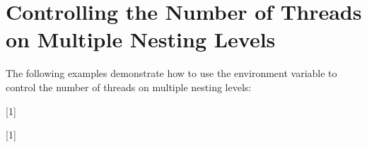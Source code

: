 \pagebreak
\section{Controlling the Number of Threads on Multiple Nesting Levels}
\label{sec:nthrs_nesting}

The following examples demonstrate how to use the  environment 
variable  to control the number of threads on multiple nesting levels:

[1]

[1]


